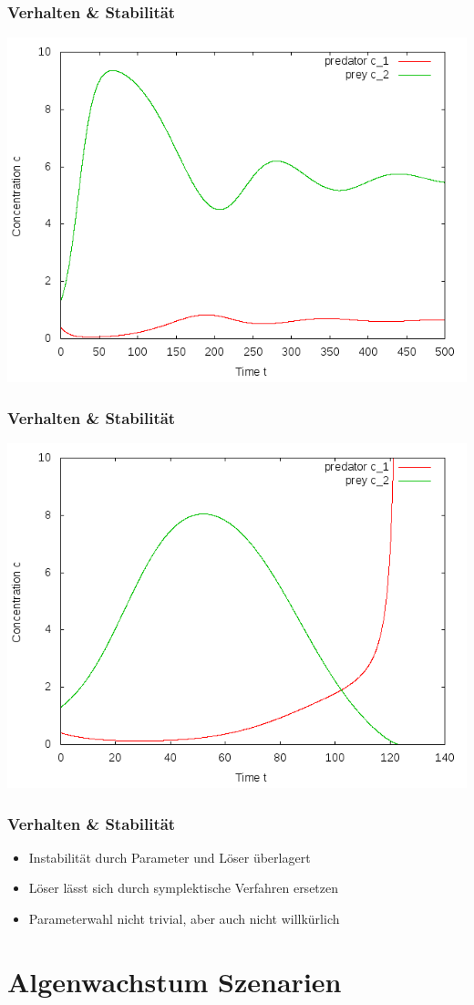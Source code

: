 \documentclass[12pt]{beamer}
\begin{document}
    \begin{frame}
    \frametitle{Verhalten \& Stabilität}
    \includegraphics[scale=0.5]{Bilder/n2_ged_schwingungen.png}
    \end{frame}
    
    \begin{frame}
    \frametitle{Verhalten \& Stabilität}
    \includegraphics[scale=0.5]{Bilder/n2_explodiert.png}
    \end{frame}
    
    \begin{frame}
    \frametitle{Verhalten \& Stabilität}
    \begin{itemize}
      \item Instabilität durch Parameter und Löser überlagert
      \item Löser lässt sich durch symplektische Verfahren ersetzen
      \item Parameterwahl nicht trivial, aber auch nicht willkürlich
    \end{itemize}
    \end{frame}
    
    \section{Algenwachstum Szenarien}
    
\end{document}
